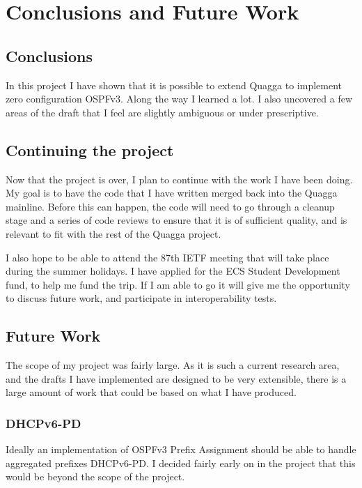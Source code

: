 \documentclass[12pt]{report}
\begin{document}
\chapter{Conclusions and Future Work}

\section{Conclusions}
In this project I have shown that it is possible to extend Quagga to implement
zero configuration OSPFv3. Along the way I learned a lot. I also uncovered a
few areas of the draft that I feel are slightly ambiguous or under
prescriptive. 

\section{Continuing the project}
Now that the project is over, I plan to continue with the work I have been
doing.  My goal is to have the code that I have written merged back into the
Quagga mainline. Before this can happen, the code will need to go through a
cleanup stage and a series of code reviews to ensure that it is of sufficient
quality, and is relevant to fit with the rest of the Quagga project.

I also hope to be able to attend the 87th IETF meeting that will take place
during the summer holidays. I have applied for the ECS Student Development
fund, to help me fund the trip. If I am able to go it will give me the
opportunity to discuss future work, and participate in interoperability tests.

\section{Future Work}
The scope of my project was fairly large. As it is such a current research
area, and the drafts I have implemented are designed to be very extensible,
there is a large amount of work that could be based on what I have produced. 

\subsection{DHCPv6-PD}
Ideally an implementation of OSPFv3 Prefix Assignment should be able to handle
aggregated prefixes DHCPv6-PD\@. I decided fairly early on in the project that
this would be beyond the scope of the project. 
\end{document}
